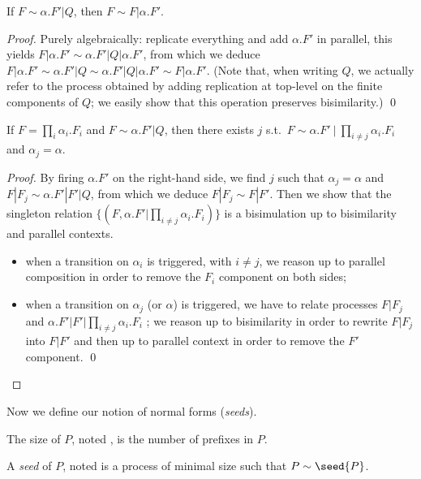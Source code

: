 \documentclass{llncs}
\begin{document}
\begin{lem}\label{lem:cancel:finite:part}
  If $\!F\sim \alpha.F'|Q$, then $\!F\sim\!F|\alpha.F'$.
\end{lem}
\begin{proof}
  Purely algebraically: replicate everything and add $\!\alpha.F'$ in
  parallel, this yields $\!F|\!\alpha.F' \sim \!\alpha.F'|\!Q|\!\alpha.F'$,
  from which we deduce $\!F|\!\alpha.F' \sim \!\alpha.F'|\!Q\sim
  \!\alpha.F'|\!Q|\alpha.F'\sim \!F|\alpha.F'$.
(Note that, when writing $\!Q$, we actually refer to the process
  obtained by adding replication at top-level on the finite components
  of $Q$; we easily show that this operation preserves bisimilarity.)
\qed
\end{proof}

\begin{lem}\label{lem:pouslemma}
  If $F=\prod_i \alpha_i.F_i$ and $\!F\sim\!\alpha.F'|Q$, then there
  exists $j$ s.t.\ $\!F\sim \!\alpha.F'~|~\prod_{i\neq
    j}\!\alpha_i.F_i$ and $\alpha_j=\alpha$.
\end{lem}
\begin{proof}
  By firing $\alpha.F'$ on the right-hand side, we find $j$ such that
  $\alpha_j=\alpha$ and $\!F|F_j\sim \!\alpha.F'|F'|Q$, from which we
  deduce $\!F|F_j\sim \!F|F'$. Then we show that the singleton
  relation $\{(\!F,\!\alpha.F'|\prod_{i\neq j}\!\alpha_i.F_i)\}$ is a
  bisimulation up to bisimilarity and parallel contexts.
  \begin{itemize}
  \item when a transition on $\alpha_i$ is triggered, with $i\neq j$,
    we reason up to parallel composition in order to remove the $F_i$
    component on both sides;
  \item when a transition on $\alpha_j$ (or $\alpha$) is triggered, we
    have to relate processes $\!F|F_j$ and
    $\!\alpha.F'|F'|\prod_{i\neq j}\!\alpha_i.F_i$ ; we reason up to
    bisimilarity in order to rewrite $\!F|F_j$ into $\!F|F'$ and then
    up to parallel context in order to remove the $F'$ component. \qed
  \end{itemize}
\end{proof}

\medskip

Now we define our notion of normal forms (\emph{seeds}).
\begin{defi} The size of $P$, noted , is the number of prefixes in $P$.

  A \emph{seed} of $P$, noted  is a process of minimal size
  such that $P\sim\seed{P}$.
\end{defi}
\end{document}
